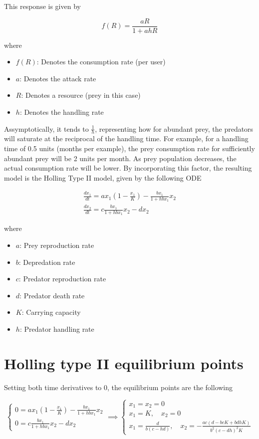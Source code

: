 \documentclass[11pt,oneside,parskip=half]{scrbook}  %
\begin{document}
This response is given by

$$
f(R)=\frac{aR}{1+ahR}
$$

where

\begin{itemize}
    \item{$f(R)$: Denotes the consumption rate (per user)}
    \item{$a$: Denotes the attack rate}
    \item{$R$: Denotes  a resource (prey in this case)}
    \item{$h$: Denotes the handling rate}
\end{itemize}

Assymptotically, it tends to $\frac 1h$, representing how for abundant prey, the predators will saturate at the reciprocal of the handling time. For example, for a handling time of 0.5 units (months per example), the prey consumption rate for sufficiently abundant prey will be 2 units per month. As prey population decreases, the actual consumption rate will be lower. By incorporating this factor, the resulting model is the Holling Type II model, given by the following ODE

$$
\begin{matrix}
\frac{dx_1}{dt}=a x_1(1-\frac{x_1}{K})-\frac{bx_1}{1+hbx_1}x_2 \\
\frac{dx_2}{dt}= c \frac{bx_1}{1+hbx_1}x_2-dx_2
\end{matrix}
$$

where

\begin{itemize}
    \item{$a$: Prey reproduction rate}
    \item{$b$: Depredation rate}
    \item{$c$: Predator reproduction rate}
    \item{$d$: Predator death rate}
    \item{$K$: Carrying capacity}
    \item{$h$: Predator handling rate}
\end{itemize}

\section{Holling type II equilibrium points}

Setting both time derivatives to 0, the equilibrium points are the following

$$
\begin{cases}
0=a x_1(1-\frac{x_1}{K})-\frac{bx_1}{1+hbx_1}x_2 \\
0= c \frac{bx_1}{1+hbx_1}x_2-dx_2
\end{cases}
\implies \begin{cases}
x_1=x_2=0 \\
x_1=K,\quad x_2=0 \\
x_1=\frac{d}{b(c-hd)},\quad x_2=-\frac{ac(d-bcK+bdhK)}{b^2(c-dh)^2K}
\end{cases}
$$
\end{document}
